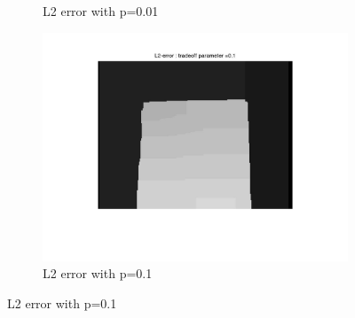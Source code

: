 \documentclass[fleqn]{article}
\begin{document}
\begin{figure}[!ht]
\begin{subfigure}{0.5\textwidth}
\caption{L2 error with p=0.01}
\end{subfigure}
 \begin{subfigure}{0.5\textwidth}
\includegraphics[scale=0.2]{./pics/map_L2_error_p=0.1.jpg}
\caption{L2 error with p=0.1}
\end{subfigure}
\end{figure}
\end{document}
